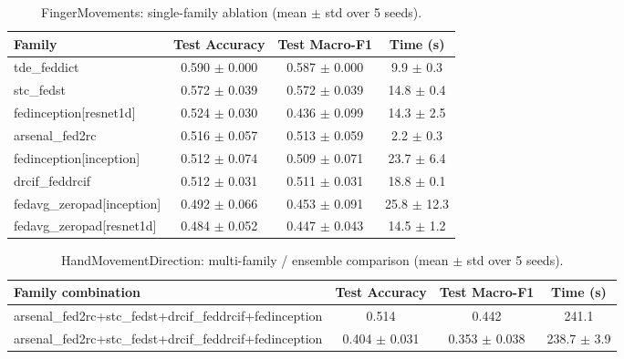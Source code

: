 \begin{table}[t]
\centering
\caption{FingerMovements: single-family ablation (mean $\pm$ std over 5 seeds).}
\label{tab:results_fingermovements_ablation}
\begin{tabular}{lccc}
\toprule
Family & Test Accuracy & Test Macro-F1 & Time (s) \\
\midrule
tde\_feddict & 0.590 $\pm$ 0.000 & 0.587 $\pm$ 0.000 & 9.9 $\pm$ 0.3 \\
stc\_fedst & 0.572 $\pm$ 0.039 & 0.572 $\pm$ 0.039 & 14.8 $\pm$ 0.4 \\
fedinception[resnet1d] & 0.524 $\pm$ 0.030 & 0.436 $\pm$ 0.099 & 14.3 $\pm$ 2.5 \\
arsenal\_fed2rc & 0.516 $\pm$ 0.057 & 0.513 $\pm$ 0.059 & 2.2 $\pm$ 0.3 \\
fedinception[inception] & 0.512 $\pm$ 0.074 & 0.509 $\pm$ 0.071 & 23.7 $\pm$ 6.4 \\
drcif\_feddrcif & 0.512 $\pm$ 0.031 & 0.511 $\pm$ 0.031 & 18.8 $\pm$ 0.1 \\
fedavg\_zeropad[inception] & 0.492 $\pm$ 0.066 & 0.453 $\pm$ 0.091 & 25.8 $\pm$ 12.3 \\
fedavg\_zeropad[resnet1d] & 0.484 $\pm$ 0.052 & 0.447 $\pm$ 0.043 & 14.5 $\pm$ 1.2 \\
\bottomrule
\end{tabular}
\end{table}

\begin{table}[t]
\centering
\caption{HandMovementDirection: multi-family / ensemble comparison (mean $\pm$ std over 5 seeds).}
\label{tab:results_handmovementdirection_ensemble}
\begin{tabular}{lccc}
\toprule
Family combination & Test Accuracy & Test Macro-F1 & Time (s) \\
\midrule
arsenal\_fed2rc+stc\_fedst+drcif\_feddrcif+fedinception & 0.514 & 0.442 & 241.1 \\
arsenal\_fed2rc+stc\_fedst+drcif\_feddrcif+fedinception & 0.404 $\pm$ 0.031 & 0.353 $\pm$ 0.038 & 238.7 $\pm$ 3.9 \\
\bottomrule
\end{tabular}
\end{table}

